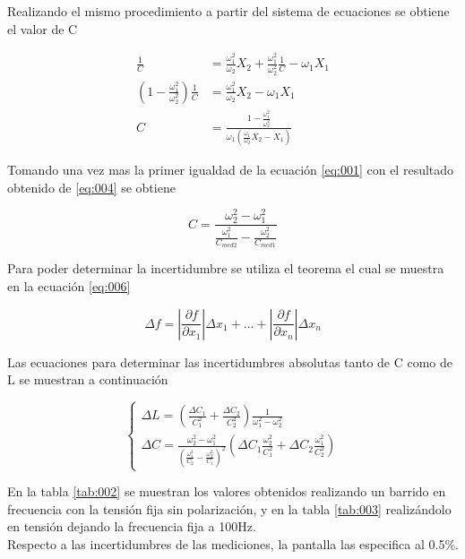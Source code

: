 \documentclass[a4paper,10pt]{article}
\begin{document}
		\indent Realizando el mismo procedimiento a partir del sistema de 
		ecuaciones se obtiene el valor de C

		\begin{align}\label{eq:004}
			\frac{1}{C} &= \frac{\omega_1^2}{\omega_2}X_2 + 
				\frac{\omega_1^2}{\omega_2^2}\frac{1}{C} - \omega_1X_1 \\
			(1 - \frac{\omega_1^2}{\omega_2^2})\frac{1}{C} &= 
			\frac{\omega_1^2}{\omega_2}X_2 - \omega_1X_1 \\
			C &= \frac{1 - \frac{\omega_1^2}{\omega_2^2}}
				{\omega_1(\frac{\omega_1}{\omega_2}X_2 - X_1)}
		\end{align}

		\indent Tomando una vez mas la primer igualdad de la ecuación 
		\ref{eq:001} con el resultado obtenido de \ref{eq:004} se obtiene

		\begin{equation}\label{eq:005}
			C = \frac{\omega_2^2 - \omega_1^2}
				{\frac{\omega_1^2}{C_{med2}} - \frac{\omega_2^2}{C_{med1}}}
		\end{equation}

		\indent Para poder determinar la incertidumbre se utiliza el teorema 
		el cual se muestra en la ecuación \ref{eq:006}

		\begin{equation}\label{eq:006}
			\Delta f = 	|\frac{\partial f}{\partial x_1}|\Delta x_1 + ... + 
						|\frac{\partial f}{\partial x_n}|\Delta x_n
		\end{equation}

		\indent Las ecuaciones para determinar las incertidumbres absolutas 
		tanto de C como de L se muestran a continuación

		\[
		\begin{cases}\label{eq:007} 
			\Delta L = (\frac{\Delta C_1}{C_1^2} + \frac{\Delta C_2}{C_2^2}) 
						\frac{1}{\omega_1^2 - \omega_2^2} \\ 
			\Delta C =  \frac{\omega_2^2 - \omega_1^2}{(\frac{\omega_1^2}{C_2} -
						\frac{\omega_2^2}{C_1})^2}(\Delta C_1\frac{\omega_2^2}
						{C_1^2} + \Delta C_2 \frac{\omega_1^2}{C_2^2})
		\end{cases}
		\]

		\indent En la tabla \ref{tab:002} se muestran los valores obtenidos 
		realizando un barrido en frecuencia con la tensión fija sin 
		polarización, y en la tabla \ref{tab:003} realizándolo en tensión 
		dejando la frecuencia fija a 100Hz. \\
		\indent Respecto a las incertidumbres de las mediciones, la pantalla las
		especifica al 0.5\%. 
\end{document}
